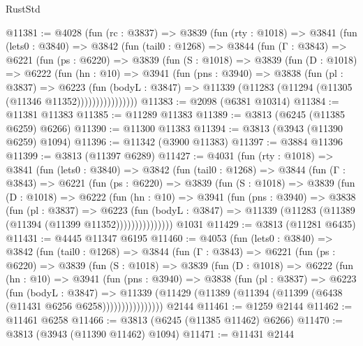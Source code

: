 \begin{lexlean}{RustStd}
\begin{coremodule}
@11381 := @4028
    (fun (rc : @3837) =>
    @3839
      (fun (rty : @1018) =>
      @3841
        (fun (lets0 : @3840) =>
        @3842
          (fun (tail0 : @1268) =>
          @3844
            (fun (Γ : @3843) =>
            @6221
              (fun (ps : @6220) =>
              @3839
                (fun (S : @1018) =>
                @3839
                  (fun (D : @1018) =>
                  @6222
                    (fun (hn : @10) =>
                    @3941
                      (fun (pns : @3940) =>
                      @3838
                        (fun (pl : @3837) =>
                        @6223
                          (fun (bodyL : @3847) =>
                          @11339 (@11283 (@11294 (@11305 (@11346 @11352))))))))))))))))
@11383 := @2098 (@6381 @10314)
@11384 := @11381 @11383
@11385 := @11289 @11383
@11389 := @3813 (@6245 (@11385 @6259) @6266)
@11390 := @11300 @11383
@11394 := @3813 (@3943 (@11390 @6259) @1094)
@11396 := @11342 (@3900 @11383)
@11397 := @3884 @11396
@11399 := @3813 (@11397 @6289)
@11427 := @4031
    (fun (rty : @1018) =>
    @3841
      (fun (lets0 : @3840) =>
      @3842
        (fun (tail0 : @1268) =>
        @3844
          (fun (Γ : @3843) =>
          @6221
            (fun (ps : @6220) =>
            @3839
              (fun (S : @1018) =>
              @3839
                (fun (D : @1018) =>
                @6222
                  (fun (hn : @10) =>
                  @3941
                    (fun (pns : @3940) =>
                    @3838
                      (fun (pl : @3837) =>
                      @6223
                        (fun (bodyL : @3847) =>
                        @11339 (@11283 (@11389 (@11394 (@11399 @11352)))))))))))))))
    @1031
@11429 := @3813 (@11281 @6435)
@11431 := @4445 @11347 @6195
@11460 := @4053
    (fun (lets0 : @3840) =>
    @3842
      (fun (tail0 : @1268) =>
      @3844
        (fun (Γ : @3843) =>
        @6221
          (fun (ps : @6220) =>
          @3839
            (fun (S : @1018) =>
            @3839
              (fun (D : @1018) =>
              @6222
                (fun (hn : @10) =>
                @3941
                  (fun (pns : @3940) =>
                  @3838
                    (fun (pl : @3837) =>
                    @6223
                      (fun (bodyL : @3847) =>
                      @11339
                        (@11429 (@11389 (@11394 (@11399 (@6438 (@11431 @6256 @6258))))))))))))))))
    @2144
@11461 := @1259 @2144
@11462 := @11461 @6258
@11466 := @3813 (@6245 (@11385 @11462) @6266)
@11470 := @3813 (@3943 (@11390 @11462) @1094)
@11471 := @11431 @2144

\end{coremodule}
\end{lexlean}

